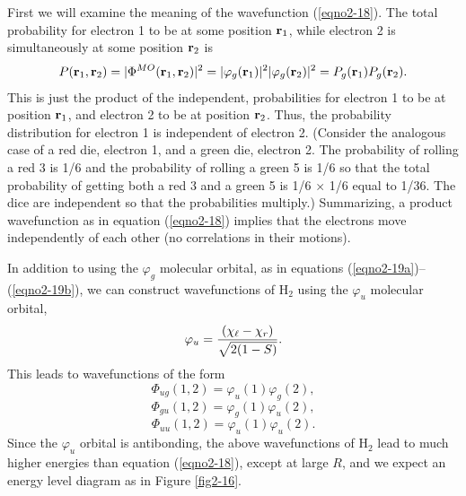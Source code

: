 First we will examine the meaning of the wavefunction
(\ref{eqno2-18}). The total probability for electron 1 to be at some
position ${\bf r}_1$, while electron 2 is simultaneously at some
position ${\bf r}_2$ is
\begin{equation}
P ( {\bf r}_1 , {\bf r}_2 ) = \vert \Phi^{MO} ( {\bf r}_1 , {\bf 
r}_2 ) \vert^2 = \vert \varphi_g ( {\bf r}_1 ) \vert^2 \vert \varphi_g 
( {\bf r}_2 )  \vert^2 = P_g ( {\bf r}_1 ) P_g ( {\bf r}_2 ) .
\end{equation}
This is just the product of the independent, probabilities for
electron 1 to be at position ${\bf r}_1$, and electron 2 to be at
position ${\bf r}_2$. Thus, the probability distribution for electron
1 is independent of electron 2. (Consider the analogous case of a red
die, electron 1, and a green die, electron 2. The probability of
rolling a red 3 is 1/6 and the probability of rolling a green 5 is 1/6
so that the total probability of getting both a red 3 and a green 5 is
1/6 $\times$ 1/6 equal to 1/36. The dice are independent so that the
probabilities multiply.)  Summarizing, a product wavefunction as in
equation (\ref{eqno2-18}) implies that the electrons move
independently of each other (no correlations in their motions).
    
In addition to using the $\varphi_g$ molecular orbital, as in
equations (\ref{eqno2-19a})--(\ref{eqno2-19b}), we can construct
wavefunctions of H$_2$ using the $\varphi_u$ molecular orbital,
\begin{equation}
\varphi_u = { \left( \chi_\ell - \chi_r \right) \over \sqrt{2(1-S)}}.
\end{equation}
This leads to wavefunctions of the form
\begin{equation}
\Phi_{ug} ( 1 , 2 ) = \varphi_u ( 1 ) \varphi_g ( 2 ) ,
\label{eqno2-20}
\end{equation}
\begin{equation}
\Phi_{gu} ( 1 , 2 ) = \varphi_g ( 1 ) \varphi_u ( 2 ) ,
\label{eqno2-21}
\end{equation}
\begin{equation}
\Phi_{uu} ( 1 , 2 ) = \varphi_u ( 1 ) \varphi_u ( 2 ).
\label{eqno2-22}
\end{equation}
Since the $\varphi_u$ orbital is antibonding, the above wavefunctions
of H$_2$ lead to much higher energies than equation (\ref{eqno2-18}),
except at large $R$, and we expect an energy level diagram as in
Figure \ref{fig2-16}.

